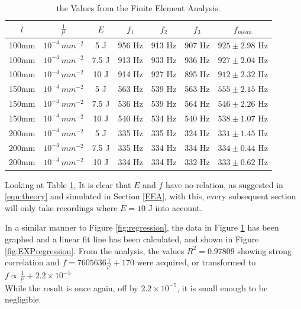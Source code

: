 \documentclass[a4paper,12pt]{article}
\begin{document}
    \begin{table}[H]%
    \begin{center}
    \begin{tabular}[H]{|c|c|c||c|c|c|c|}
    \hline
    $l$ & $\frac{1}{l^2}$ & $E$ & $f_1$ & $f_2$ & $f_3$ & $f_{mean}$  \\
    \hline\hline
    100mm & $10^{-4}~mm^{-2}$ & 5 J & 956 Hz & 913 Hz & 907 Hz & $925\pm2.98$ Hz \\
    \hline
    100mm & $10^{-4}~mm^{-2}$ & 7.5 J & 913 Hz & 933 Hz & 936 Hz & $927\pm2.04$ Hz \\
    \hline
    100mm & $10^{-4}~mm^{-2}$ & 10 J & 914 Hz & 927 Hz & 895 Hz &$912\pm2.32$ Hz \\
    \hline
    150mm & $10^{-4}~mm^{-2}$ & 5 J & 563 Hz & 539 Hz & 563 Hz &$555\pm2.15$ Hz \\
    \hline
    150mm & $10^{-4}~mm^{-2}$ & 7.5 J & 536 Hz & 539 Hz & 564 Hz &$546\pm2.26$ Hz \\
    \hline
    150mm & $10^{-4}~mm^{-2}$ & 10 J & 540 Hz & 534 Hz & 540 Hz &$538\pm1.07$ Hz \\
    \hline
    200mm & $10^{-4}~mm^{-2}$ & 5 J & 335 Hz & 335 Hz & 324 Hz &$331\pm1.45$ Hz \\
    \hline
    200mm & $10^{-4}~mm^{-2}$ & 7.5 J & 335 Hz & 334 Hz & 334 Hz &$334\pm0.44$ Hz \\
    \hline
    200mm & $10^{-4}~mm^{-2}$ & 10 J & 334 Hz & 334 Hz & 332 Hz &$333\pm0.62$ Hz \\
    \hline
    \end{tabular}
    \end{center}
    \caption{the Values from the Finite Element Analysis.}\label{Tab:TableResults}
    \end{table}
    Looking at Table \ref{Tab:TableResults}, It is clear that $E$ and $f$ have no relation, as suggested in \eqref{eqn:theory} and simulated in Section \ref{FEA}, with this, every subsequent section will only take recordings where $E=10$ J into account.

    In a similar manner to Figure \ref{fig:regression}, the data in Figure \ref{Tab:TableResults} has been graphed and a linear fit line has been calculated, and shown in Figure \ref{fig:EXPregression}.
    From the analysis, the values $R^2=0.97809$ showing strong correlation and $f=7605636\frac{1}{l^{2}}+170$ were acquired, or transformed to $f\propto\frac{1}{l^{2}}+2.2\times10^{-5}$\\
    While the result is once again, off by $2.2\times10^{-5}$, it is small enough to be negligible.
\end{document}
